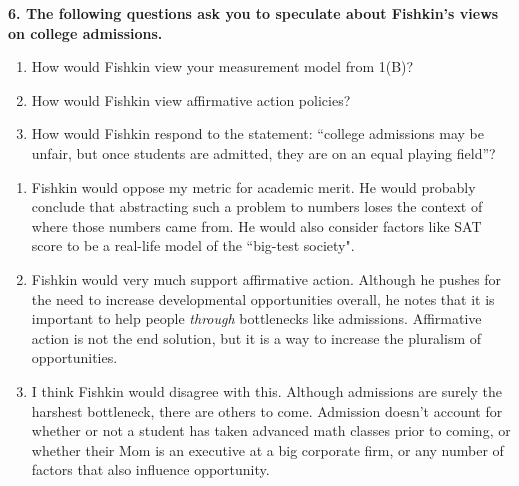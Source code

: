 \documentclass{article}
\begin{document}
\textbf{6. The following questions ask you to speculate about Fishkin's views on college admissions.}
\begin{enumerate}[label=\Alph*.]
    \item How would Fishkin view your measurement model from 1(B)?
    \item How would Fishkin view affirmative action policies?
    \item How would Fishkin respond to the statement: ``college admissions may be unfair, but once students are admitted, they are on an equal playing field''?
\end{enumerate}
\bigskip
\begin{mdframed}
\begin{enumerate}[label=\Alph*.]
\item Fishkin would oppose my metric for academic merit. He would probably conclude that abstracting such a problem to numbers loses the context of where those numbers came from. He would also consider factors like SAT score to be a real-life model of the ``big-test society".
\item Fishkin would very much support affirmative action. Although he pushes for the need to increase developmental opportunities overall, he notes that it is important to help people \textit{through} bottlenecks like admissions. Affirmative action is not the end solution, but it is a way to increase the pluralism of opportunities.
\item I think Fishkin would disagree with this. Although admissions are surely the harshest bottleneck, there are others to come. Admission doesn't account for whether or not a student has taken advanced math classes prior to coming, or whether their Mom is an executive at a big corporate firm, or any number of factors that also influence opportunity. 
\end{enumerate}
\end{mdframed}
\bigskip
\end{document}
